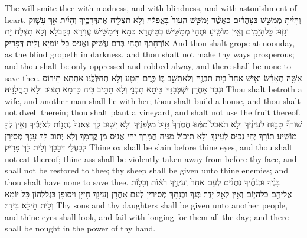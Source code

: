 {The \lord\space will smite thee with madness, and with blindness, and with astonishment of heart.}{}
{וְהָיִ֜יתָ מְמַשֵּׁ֣שׁ בַּֽצׇּהֳרַ֗יִם כַּאֲשֶׁ֨ר יְמַשֵּׁ֤שׁ הַֽעִוֵּר֙ בָּאֲפֵלָ֔ה וְלֹ֥א תַצְלִ֖יחַ אֶת\maqqaf דְּרָכֶ֑יךָ וְהָיִ֜יתָ אַ֣ךְ עָשׁ֧וּק וְגָז֛וּל כׇּל\maqqaf הַיָּמִ֖ים וְאֵ֥ין מוֹשִֽׁיעַ׃}
{וּתְהֵי מְמַשֵּׁישׁ בְּטֵיהֲרָא כְּמָא דִּימַשֵּׁישׁ עֲוִירָא בְּקַבְלָא וְלָא תַצְלַח יָת אוֹרְחָתָךְ וּתְהֵי בְּרַם עֲשִׁיק וַאֲנִיס כָּל יוֹמַיָּא וְלֵית דְּפָרִיק׃}
{And thou shalt grope at noonday, as the blind gropeth in darkness, and thou shalt not make thy ways prosperous; and thou shalt be only oppressed and robbed alway, and there shall be none to save thee.}{}
{אִשָּׁ֣ה תְאָרֵ֗שׂ וְאִ֤ישׁ אַחֵר֙  בַּ֥יִת תִּבְנֶ֖ה וְלֹא\maqqaf תֵשֵׁ֣ב בּ֑וֹ כֶּ֥רֶם תִּטַּ֖ע וְלֹ֥א תְחַלְּלֶֽנּוּ׃}
{אִתְּתָא תֵירוֹס וּגְבַר אָחֳרָן יִשְׁכְּבִנַּהּ בֵּיתָא תִבְנֵי וְלָא תִתֵּיב בֵּיהּ כַּרְמָא תִצּוּב וְלָא תַחֲלִנֵּיהּ׃}
{Thou shalt betroth a wife, and another man shall lie with her; thou shalt build a house, and thou shalt not dwell therein; thou shalt plant a vineyard, and shalt not use the fruit thereof.}{}
{שׁוֹרְךָ֞ טָב֣וּחַ לְעֵינֶ֗יךָ וְלֹ֣א תֹאכַל֮ מִמֶּ֒נּוּ֒ חֲמֹֽרְךָ֙ גָּז֣וּל מִלְּפָנֶ֔יךָ וְלֹ֥א יָשׁ֖וּב לָ֑ךְ צֹֽאנְךָ֙ נְתֻנ֣וֹת לְאֹיְבֶ֔יךָ וְאֵ֥ין לְךָ֖ מוֹשִֽׁיעַ׃}
{תּוֹרָךְ יְהֵי נְכִיס לְעֵינָךְ וְלָא תֵיכוֹל מִנֵּיהּ חֲמָרָךְ יְהֵי אֲנִיס מִן קֳדָמָךְ וְלָא יְתוּב לָךְ עָנָךְ מְסִירָן לְבַעֲלֵי דְּבָבָךְ וְלֵית לָךְ פָּרִיק׃}
{Thine ox shall be slain before thine eyes, and thou shalt not eat thereof; thine ass shall be violently taken away from before thy face, and shall not be restored to thee; thy sheep shall be given unto thine enemies; and thou shalt have none to save thee.}{}
{בָּנֶ֨יךָ וּבְנֹתֶ֜יךָ נְתֻנִ֨ים לְעַ֤ם אַחֵר֙ וְעֵינֶ֣יךָ רֹא֔וֹת וְכָל֥וֹת אֲלֵיהֶ֖ם כׇּל\maqqaf הַיּ֑וֹם וְאֵ֥ין לְאֵ֖ל יָדֶֽךָ׃}
{בְּנָךְ וּבְנָתָךְ מְסִירִין לְעַם אָחֳרָן וְעֵינָךְ חָזְיָן וִיסוּפָן בִּגְלַלְהוֹן כָּל יוֹמָא וְלֵית חֵילָא בִּידָךְ׃}
{Thy sons and thy daughters shall be given unto another people, and thine eyes shall look, and fail with longing for them all the day; and there shall be nought in the power of thy hand.}{}
